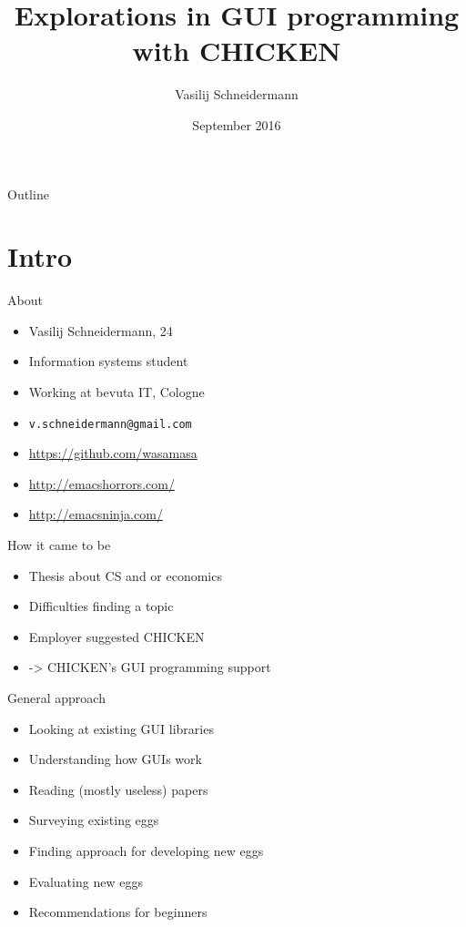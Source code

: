 \documentclass[presentation]{beamer}
\author{Vasilij Schneidermann}
\date{September 2016}
\title{Explorations in GUI programming with CHICKEN}
\begin{document}
\maketitle
\begin{frame}{Outline}
\tableofcontents
\end{frame}

\AtBeginSection{\frame{\sectionpage}}

\section{Intro}
\label{sec-1}

\begin{frame}[label=sec-1-1]{About}
\begin{itemize}
\item Vasilij Schneidermann, 24
\item Information systems student
\item Working at bevuta IT, Cologne
\item \texttt{v.schneidermann@gmail.com}
\item \url{https://github.com/wasamasa}
\item \url{http://emacshorrors.com/}
\item \url{http://emacsninja.com/}
\end{itemize}
\end{frame}

\begin{frame}[label=sec-1-2]{How it came to be}
\begin{itemize}
\item Thesis about CS and or economics
\item Difficulties finding a topic
\item Employer suggested CHICKEN
\item -> CHICKEN's GUI programming support
\end{itemize}
\end{frame}

\begin{frame}[label=sec-1-3]{General approach}
\begin{itemize}
\item Looking at existing GUI libraries
\item Understanding how GUIs work
\item Reading (mostly useless) papers
\item Surveying existing eggs
\item Finding approach for developing new eggs
\item Evaluating new eggs
\item Recommendations for beginners
\end{itemize}
\end{frame}
\end{document}
